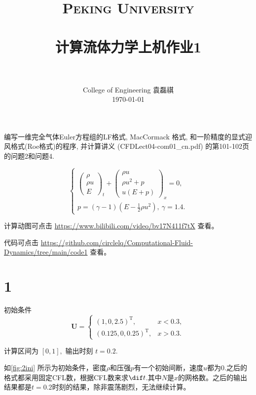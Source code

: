 \documentclass[12pt]{article}
\title{
		\vspace{-1in} 	
		\usefont{OT1}{bch}{b}{n}
		\normalfont \normalsize \textsc{\LARGE Peking University}\\[0.2cm] %
		\horrule{0.5pt} \\[0.2cm]
		\huge \bfseries{计算流体力学上机作业1} \\[-0.2cm]
		\horrule{2pt} \\[0.2cm]
}
\author{
		\normalfont 								\normalsize
		College of Engineering \quad 2001111690  \quad 袁磊祺\\	\normalsize
        \today
}
\date{}
\begin{document}


\maketitle

编写一维完全气体Euler方程组的LF格式, MacCormack 格式, 和一阶精度的显式迎风格式(Roe格式)的程序, 并计算讲义 (CFDLect04-com01_cn.pdf) 的第101-102页的问题2和问题4.

\begin{equation}
	\left\{\begin{array}{c}
		\left(\begin{array}{c}
			\rho   \\
			\rho u \\
			E
		\end{array}\right)_{t}+\left(\begin{array}{c}
				\rho u       \\
				\rho u^{2}+p \\
				u(E+p)
			\end{array}\right)_x=0, \\
		p=(\gamma-1)\left(E-\frac{1}{2} \rho u^{2}\right),\ \gamma=1.4.
	\end{array}\right.
\end{equation}

计算动图可点击 \href{https://www.bilibili.com/video/bv17N411f7tX}{https://www.bilibili.com/video/bv17N411f7tX} 查看。

代码可点击 \href{https://github.com/circlelq/Computational-Fluid-Dynamics/tree/main/code1}{https://github.com/circlelq/Computational-Fluid-Dynamics/tree/main/code1} 查看。


\section{1}

初始条件
\begin{equation}
	\boldsymbol{U}=\left\{\begin{array}{ll}
		(1,0,2.5)^{\mathrm{T}},      & x<0.3, \\
		(0.125,0,0.25)^{\mathrm{T}}, & x>0.3.
	\end{array}\right.
\end{equation}

计算区间为 $[0,1],$ 输出时刻 $t=0.2 .$

如\cref{fig:2ini} 所示为初始条件，密度$\rho$和压强$p$有一个初始间断，速度$u$都为0.之后的格式都采用固定CFL数，根据CFL数来求$\dif t$.其中$N$是$x$的网格数。之后的输出结果都是$t=0.2$时刻的结果，除非震荡剧烈，无法继续计算。
\end{document}
